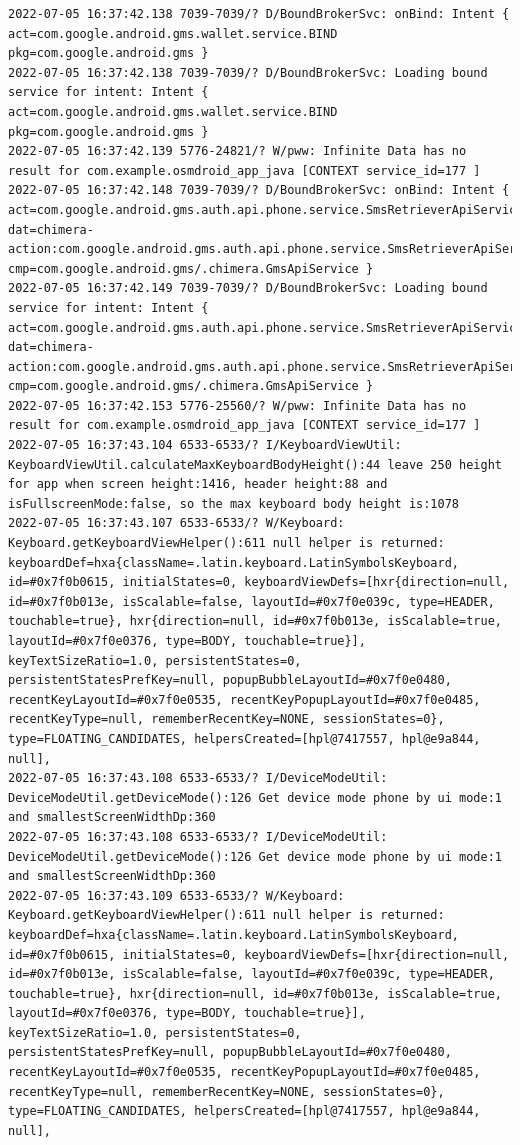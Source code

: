 \documentclass[a4paper,12pt]{book}
\begin{document}
\begin{lstlisting}
2022-07-05 16:37:42.138 7039-7039/? D/BoundBrokerSvc: onBind: Intent { act=com.google.android.gms.wallet.service.BIND pkg=com.google.android.gms }
2022-07-05 16:37:42.138 7039-7039/? D/BoundBrokerSvc: Loading bound service for intent: Intent { act=com.google.android.gms.wallet.service.BIND pkg=com.google.android.gms }
2022-07-05 16:37:42.139 5776-24821/? W/pww: Infinite Data has no result for com.example.osmdroid_app_java [CONTEXT service_id=177 ]
2022-07-05 16:37:42.148 7039-7039/? D/BoundBrokerSvc: onBind: Intent { act=com.google.android.gms.auth.api.phone.service.SmsRetrieverApiService.START dat=chimera-action:com.google.android.gms.auth.api.phone.service.SmsRetrieverApiService.START cmp=com.google.android.gms/.chimera.GmsApiService }
2022-07-05 16:37:42.149 7039-7039/? D/BoundBrokerSvc: Loading bound service for intent: Intent { act=com.google.android.gms.auth.api.phone.service.SmsRetrieverApiService.START dat=chimera-action:com.google.android.gms.auth.api.phone.service.SmsRetrieverApiService.START cmp=com.google.android.gms/.chimera.GmsApiService }
2022-07-05 16:37:42.153 5776-25560/? W/pww: Infinite Data has no result for com.example.osmdroid_app_java [CONTEXT service_id=177 ]
2022-07-05 16:37:43.104 6533-6533/? I/KeyboardViewUtil: KeyboardViewUtil.calculateMaxKeyboardBodyHeight():44 leave 250 height for app when screen height:1416, header height:88 and isFullscreenMode:false, so the max keyboard body height is:1078
2022-07-05 16:37:43.107 6533-6533/? W/Keyboard: Keyboard.getKeyboardViewHelper():611 null helper is returned: keyboardDef=hxa{className=.latin.keyboard.LatinSymbolsKeyboard, id=#0x7f0b0615, initialStates=0, keyboardViewDefs=[hxr{direction=null, id=#0x7f0b013e, isScalable=false, layoutId=#0x7f0e039c, type=HEADER, touchable=true}, hxr{direction=null, id=#0x7f0b013e, isScalable=true, layoutId=#0x7f0e0376, type=BODY, touchable=true}], keyTextSizeRatio=1.0, persistentStates=0, persistentStatesPrefKey=null, popupBubbleLayoutId=#0x7f0e0480, recentKeyLayoutId=#0x7f0e0535, recentKeyPopupLayoutId=#0x7f0e0485, recentKeyType=null, rememberRecentKey=NONE, sessionStates=0}, type=FLOATING_CANDIDATES, helpersCreated=[hpl@7417557, hpl@e9a844, null], 
2022-07-05 16:37:43.108 6533-6533/? I/DeviceModeUtil: DeviceModeUtil.getDeviceMode():126 Get device mode phone by ui mode:1 and smallestScreenWidthDp:360
2022-07-05 16:37:43.108 6533-6533/? I/DeviceModeUtil: DeviceModeUtil.getDeviceMode():126 Get device mode phone by ui mode:1 and smallestScreenWidthDp:360
2022-07-05 16:37:43.109 6533-6533/? W/Keyboard: Keyboard.getKeyboardViewHelper():611 null helper is returned: keyboardDef=hxa{className=.latin.keyboard.LatinSymbolsKeyboard, id=#0x7f0b0615, initialStates=0, keyboardViewDefs=[hxr{direction=null, id=#0x7f0b013e, isScalable=false, layoutId=#0x7f0e039c, type=HEADER, touchable=true}, hxr{direction=null, id=#0x7f0b013e, isScalable=true, layoutId=#0x7f0e0376, type=BODY, touchable=true}], keyTextSizeRatio=1.0, persistentStates=0, persistentStatesPrefKey=null, popupBubbleLayoutId=#0x7f0e0480, recentKeyLayoutId=#0x7f0e0535, recentKeyPopupLayoutId=#0x7f0e0485, recentKeyType=null, rememberRecentKey=NONE, sessionStates=0}, type=FLOATING_CANDIDATES, helpersCreated=[hpl@7417557, hpl@e9a844, null], 

\end{lstlisting}
\end{document}

